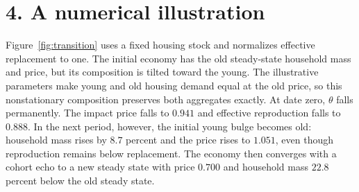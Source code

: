 \documentclass[11pt]{article}
\begin{document}
\section*{4. A numerical illustration}

Figure~\ref{fig:transition} uses a fixed housing stock and normalizes effective
replacement to one. The initial economy has the old steady-state household mass
and price, but its composition is tilted toward the young. The illustrative
parameters make young and old housing demand equal at the old price, so this
nonstationary composition preserves both aggregates exactly. At date zero,
$\theta$ falls permanently. The impact price falls to $0.941$ and effective
reproduction falls to $0.888$. In the next period, however, the initial young
bulge becomes old: household mass rises by $8.7$ percent and the price rises to
$1.051$, even though reproduction remains below replacement. The economy then
converges with a cohort echo to a new steady state with price $0.700$ and
household mass $22.8$ percent below the old steady state.
\end{document}
